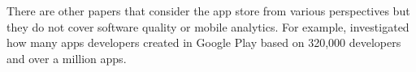 There are  other papers that consider the app store from various perspectives but they do not cover software quality or mobile analytics. For example, 
 investigated how many apps developers created in Google Play based on 320,000 developers and over a million apps.

